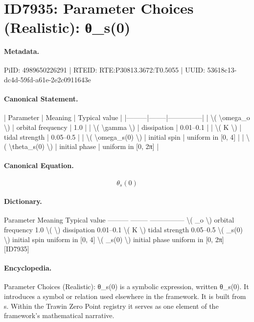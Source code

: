 \section*{ID7935: Parameter Choices (Realistic): θ\_s(0)}
\paragraph{Metadata.}
PiID: 4989650226291 | RTEID: RTE:P30813.3672:T0.5055 | UUID: 53618c13-dc4d-59fd-a61e-2e2c0911643e

\paragraph{Canonical Statement.}
| Parameter | Meaning | Typical value | |---------|--------|---------------| | \textbackslash{}( \textbackslash{}omega\_o \textbackslash{}) | orbital frequency | 1.0 | | \textbackslash{}( \textbackslash{}gamma \textbackslash{}) | dissipation | 0.01–0.1 | | \textbackslash{}( K \textbackslash{}) | tidal strength | 0.05–0.5 | | \textbackslash{}( \textbackslash{}omega\_s(0) \textbackslash{}) | initial spin | uniform in [0, 4] | | \textbackslash{}( \textbackslash{}theta\_s(0) \textbackslash{}) | initial phase | uniform in [0, 2π] |

\paragraph{Canonical Equation.}
\[
\theta_s(0)
\]

\paragraph{Dictionary.}
Parameter Meaning Typical value --------- -------- --------------- \textbackslash{}( \_o \textbackslash{}) orbital frequency 1.0 \textbackslash{}( \textbackslash{}) dissipation 0.01–0.1 \textbackslash{}( K \textbackslash{}) tidal strength 0.05–0.5 \textbackslash{}( \_s(0) \textbackslash{}) initial spin uniform in [0, 4] \textbackslash{}( \_s(0) \textbackslash{}) initial phase uniform in [0, 2π] [ID7935]

\paragraph{Encyclopedia.}
Parameter Choices (Realistic): θ\_s(0) is a symbolic expression, written θ\_s(0). It introduces a symbol or relation used elsewhere in the framework. It is built from s. Within the Trawin Zero Point registry it serves as one element of the framework's mathematical narrative.

